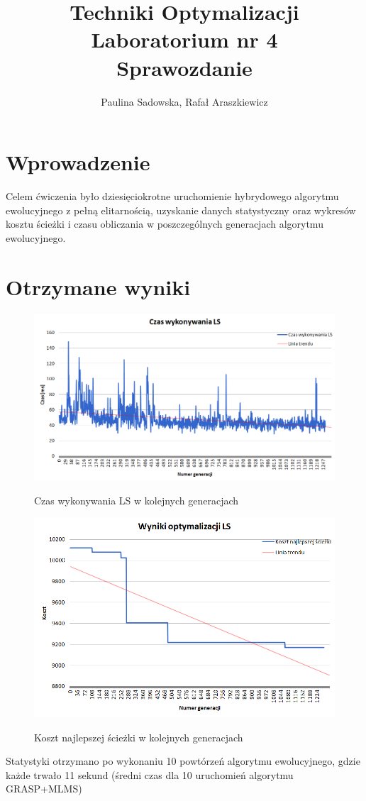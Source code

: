 \documentclass[a4paper 10pt]{article}
\title{\textbf{Techniki Optymalizacji} \\
Laboratorium nr 4 \\
Sprawozdanie}
\author{Paulina Sadowska, Rafał Araszkiewicz}
\begin{document}
\maketitle

\section{Wprowadzenie}
Celem ćwiczenia było dziesięciokrotne uruchomienie hybrydowego algorytmu ewolucyjnego z pełną elitarnością, uzyskanie danych statystyczny oraz wykresów kosztu ścieżki i czasu obliczania w poszczególnych generacjach algorytmu ewolucyjnego.

\section{Otrzymane wyniki}


\begin{figure} [H]
\centering
\caption{Czas wykonywania LS w kolejnych generacjach}
\includegraphics[angle=0,width = 1\textwidth, height=!]{images/czas_ls.png}
\label{Rys. Edges}
\end{figure}

\begin{figure} [H]
\centering
\caption{Koszt najlepszej ścieżki w kolejnych generacjach}
\includegraphics[angle=0,width = 1\textwidth, height=!]{images/wyniki_opti.png}
\label{Rys. Node}
\end{figure}

Statystyki otrzymano po wykonaniu 10 powtórzeń algorytmu ewolucyjnego, gdzie każde trwało 11 sekund (średni czas dla 10 uruchomień algorytmu GRASP+MLMS)
\end{document}
